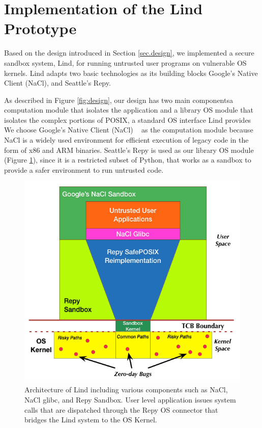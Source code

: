 \section{Implementation of the Lind Prototype}
\label{sec.implementation}

Based on the design introduced in Section \ref{sec.design},
we implemented a secure sandbox system, Lind,
for running untrusted user programs on vulnerable OS kernels.
Lind adapts two basic technologies as its building blocks\textendash
Google's Native Client (NaCl), and Seattle's Repy.

As described in Figure \ref{fig:design}, our design has
two main components\textendash a computation module that isolates the
application and a library OS module that isolates the complex
portions of POSIX, a standard OS interface Lind provides
We choose Google's Native Client (NaCl) ~\cite{NaCl-09} as the computation
module because NaCl is a widely used environment for efficient execution of legacy code in the
form of x86 and ARM binaries. 
Seattle's Repy is used as our library OS module (Figure \ref{fig:architecture}), since it is a restricted subset of Python, 
that works as a sandbox to provide a safer environment to run untrusted code.

\begin{figure}%
\centering
	\includegraphics[width=1.0\columnwidth]{diagram/lind_architecture_new.png}
	\caption{Architecture of Lind including various components such as NaCl, NaCl glibc, and Repy Sandbox.
	User level application issues system calls that are dispatched through the Repy OS connector that bridges the Lind system to the OS Kernel.}
\label{fig:architecture}
\end{figure}

